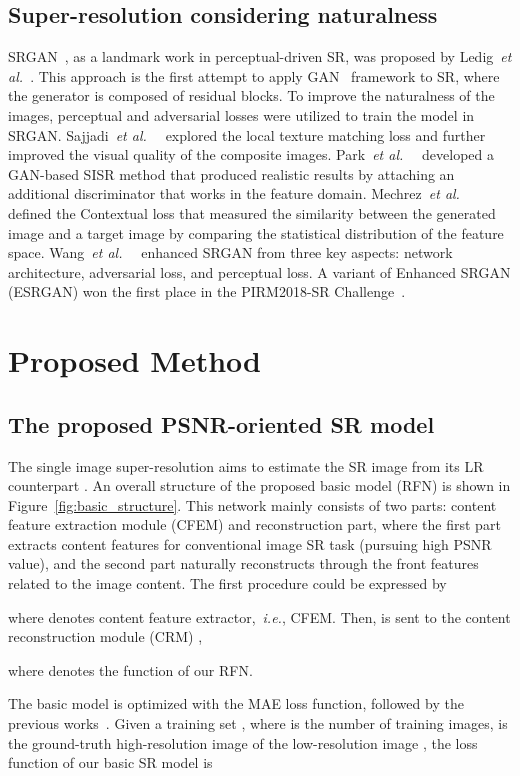 \documentclass[preprint]{elsarticle}
\newcommand{\etal}{\textit{et al.~}}
\newcommand{\ie}{\textit{i.e.}}
\begin{document}
\subsection{Super-resolution considering naturalness}
SRGAN~\cite{SRGAN}, as a landmark work in perceptual-driven SR, was proposed by Ledig~\etal. This approach is the first attempt to apply GAN~\cite{GAN} framework to SR, where the generator is composed of residual blocks. To improve the naturalness of the images, perceptual and adversarial losses were utilized to train the model in SRGAN. Sajjadi~\etal~\cite{EnhanceNet} explored the local texture matching loss and further improved the visual quality of the composite images. Park~\etal~\cite{SRFeat} developed a GAN-based SISR method that produced realistic results by attaching an additional discriminator that works in the feature domain. Mechrez~\etal~\cite{CX} defined the Contextual loss that measured the similarity between the generated image and a target image by comparing the statistical distribution of the feature space. Wang~\etal~\cite{ESRGAN} enhanced SRGAN from three key aspects: network architecture, adversarial loss, and perceptual loss. A variant of Enhanced SRGAN (ESRGAN) won the first place in the PIRM2018-SR Challenge~\cite{PIRM-SR}.

\section{Proposed Method}\label{sec:proposed-method}
\subsection{The proposed PSNR-oriented SR model}
The single image super-resolution aims to estimate the SR image  from its LR counterpart . An overall structure of the proposed basic model (RFN) is shown in Figure~\ref{fig:basic_structure}. This network mainly consists of two parts: content feature extraction module (CFEM) and reconstruction part, where the first part extracts content features for conventional image SR task (pursuing high PSNR value), and the second part naturally reconstructs  through the front features related to the image content. The first procedure could be expressed by


where  denotes content feature extractor,~\ie, CFEM. Then,  is sent to the content reconstruction module (CRM) ,

where  denotes the function of our RFN.

The basic model is optimized with the MAE loss function, followed by the previous works~\cite{EDSR,RDN,RCAN}. Given a training set , where  is the number of training images,  is the ground-truth high-resolution image of the low-resolution image , the loss function of our basic SR model is
\end{document}

